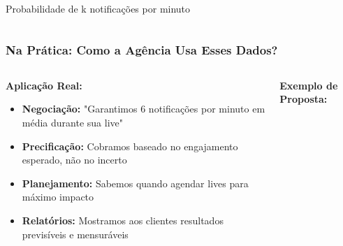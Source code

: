 \documentclass[aspectratio=169,12pt]{beamer}
\begin{document}
\begin{frame}
\begin{columns}
\begin{column}{0.45\textwidth}
\begin{center}
                \vspace{0.2cm}
                \small{Probabilidade de k notificações por minuto}
            \end{center}
        \end{column}
    \end{columns}
\end{frame}

\begin{frame}
    \frametitle{Na Prática: Como a Agência Usa Esses Dados?}
    
    \begin{columns}
        \begin{column}{0.6\textwidth}
            \textbf{\Large Aplicação Real:}
            \vspace{0.5cm}
            
            \begin{itemize}
                \item[\faIcon{handshake}] \textcolor{azulprincipal}{\textbf{Negociação:}} "Garantimos 6 notificações por minuto em média durante sua live"
                \vspace{0.3cm}
                
                \item[\faIcon{money-bill}] \textcolor{azulprincipal}{\textbf{Precificação:}} Cobramos baseado no engajamento esperado, não no incerto
                \vspace{0.3cm}
                
                \item[\faIcon{calendar}] \textcolor{azulprincipal}{\textbf{Planejamento:}} Sabemos quando agendar lives para máximo impacto
                \vspace{0.3cm}
                
                \item[\faIcon{chart-bar}] \textcolor{azulprincipal}{\textbf{Relatórios:}} Mostramos aos clientes resultados previsíveis e mensuráveis
            \end{itemize}
        \end{column}
        
        \begin{column}{0.4\textwidth}
            \begin{center}
                \textbf{\large Exemplo de Proposta:}
                \vspace{0.3cm}
                

\end{center}
\end{column}
\end{columns}
\end{frame}
\end{document}
